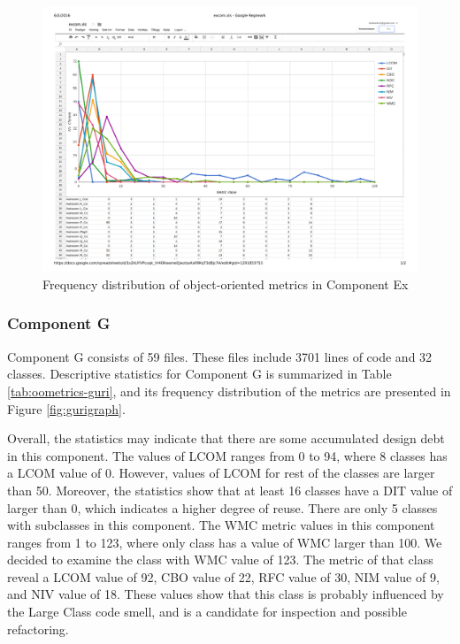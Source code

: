 \begin{landscape}
\setlength\LTleft{-.5in}
	\begin{figure}
	\centering
	\includegraphics[width=\textwidth]{images/pdf/ex.pdf}
	\caption{Frequency distribution of object-oriented metrics in Component Ex}
	\label{fig:exgraph}
	\end{figure}
\end{landscape}






\subsubsection{Component G}
Component G consists of 59 files. These files include 3701 lines of code and 32 classes. Descriptive statistics for Component G is summarized in Table \ref{tab:oometrics-guri}, and its frequency distribution of the metrics are presented in Figure \ref{fig:gurigraph}. 

Overall, the statistics may indicate that there are some accumulated design debt in this component. The values of LCOM ranges from 0 to 94, where 8 classes has a LCOM value of 0. However, values of LCOM for rest of the classes are larger than 50. Moreover, the statistics show that at least 16 classes have a DIT value of larger than 0, which indicates a higher degree of reuse. There are only 5 classes with subclasses in this component. The WMC metric values in this component ranges from 1 to 123, where only class has a value of WMC larger than 100. We decided to examine the class with WMC value of 123. The metric of that class reveal a LCOM value of 92, CBO value of 22, RFC value of 30, NIM value of 9, and NIV value of 18. These values show that this class is probably influenced by the Large Class code smell, and is a candidate for inspection and possible refactoring.



